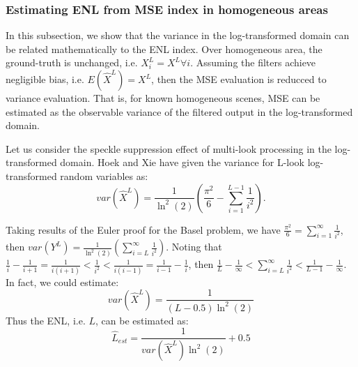 \subsubsection{ Estimating ENL from MSE index in homogeneous areas }
\label{sec:homogeneous_theoretical}

In this subsection, we show that the variance in the log-transformed domain can be related mathematically to the ENL 
index. Over homogeneous area, the ground-truth is unchanged, i.e. $X^L_i=X^L \forall i$.
Assuming the filters achieve negligible bias, i.e. $E(\hat{X}^L)=X^L$, 
	then the MSE evaluation is reducced to variance evaluation.
That is, for known homogeneous scenes, MSE can be estimated as the observable variance of the filtered 
output in the log-transformed domain.

Let us consider the speckle suppression effect of multi-look processing in the log-transformed domain. 
Hoek \cite{Hoekman_1991_TGRS} and Xie \cite{Xie_2002_TGRS} have given the variance for L-look log-transformed random 
variables as: 
\begin{equation}
var(\hat{X}^L)= \frac{1}{\ln^2(2)} \left( \frac{\pi^2}{6} - \sum^{L-1}_{i=1}{\frac{1}{i^2}} \right).
\label{eqn:perf_index_theoretical}
\end{equation}

Taking results of the Euler proof for the Basel problem, we have $\frac{\pi^2}{6} = \sum^{\infty}_{i=1}{ \frac{1}{i^2} } $, then $var(Y^L)= \frac{1}{\ln^2(2)} \left( \sum^{\infty}_{i=L}{ \frac{1}{i^2} } \right) $.
Noting that $ \frac{1}{i} - \frac{1}{i+1} = \frac{1}{i(i+1)} < \frac{1}{i^2} < \frac{1}{i(i-1)} = \frac{1}{i-1} - \frac{1}{i}$, then $ \frac{1}{L} - \frac{1}{\infty} < \sum^{\infty}_{i=L}{ \frac{1}{i^2} }  < \frac{1}{L-1} - \frac{1}{\infty} $.
In fact, we could estimate:
\begin{equation}
  var(\hat{X}^L) = \frac{1}{(L-0.5) \ln^2(2) }
\label{eqn:perf_index_analytic}
\end{equation}
Thus the ENL, i.e. $L$, can be estimated as:
\begin{equation}
\hat{L}_{est} = \frac{1}{var(\hat{X}^L) \ln^2(2)} + 0.5
\label{eqn:enl_analytic}
\end{equation}

